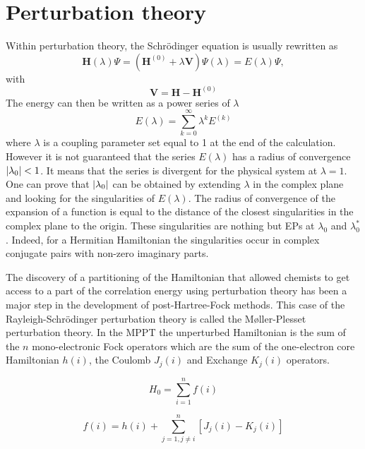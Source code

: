 \documentclass[11pt,a4paper]{article}
\newcommand{\bH}{\mathbf{H}}
\newcommand{\bV}{\mathbf{V}}
\begin{document}
\section{Perturbation theory}


Within perturbation theory, the Schr\"odinger equation is usually rewritten as 
\begin{equation}
	\bH(\lambda) \Psi = (\bH^{(0)} + \lambda \bV ) \Psi(\lambda) = E(\lambda) \Psi,
\end{equation}
with
\begin{equation}
\bV=\bH - \bH^{(0)}
\end{equation}
The energy can then be written as a power series of $\lambda$
\begin{equation}
	E(\lambda) = \sum_{k=0}^\infty \lambda^k E^{(k)}
\end{equation}
where $\lambda$ is a coupling parameter set equal to 1 at the end of the calculation. However it is not guaranteed that the series $E(\lambda)$ has a radius of convergence $\abs{\lambda_0} < 1$. It means that the series is divergent for the physical system at $\lambda=1$. One can prove that $\abs{\lambda_0}$ can be obtained by extending $\lambda$ in the complex plane and looking for the singularities of $E(\lambda)$. The radius of convergence of the expansion of a function is equal to the distance of the closest singularities in the complex plane to the origin. These singularities are nothing but EPs at $\lambda_0$ and $\lambda_0^*$. Indeed, for a Hermitian Hamiltonian the singularities occur in complex conjugate pairs with non-zero imaginary parts.

 The discovery of a partitioning of the Hamiltonian that allowed chemists to get access to a part of the correlation energy using perturbation theory has been a major step in the development of post-Hartree-Fock methods. This case of the Rayleigh-Schrödinger perturbation theory is called the M{\o}ller-Plesset perturbation theory. In the MPPT the unperturbed Hamiltonian is the sum of the $n$ mono-electronic Fock operators which are the sum of the one-electron core Hamiltonian $h(i)$, the Coulomb $J_j(i)$ and Exchange $K_j(i)$ operators.
 
\begin{equation}
H_0= \sum\limits_{i=1}^{n} f(i)
\end{equation}

\begin{equation}
f(i) = h(i) + \sum\limits_{j=1,j \neq i}^{n} \left[J_j(i) - K_j(i)\right]
\end{equation}
\end{document}
